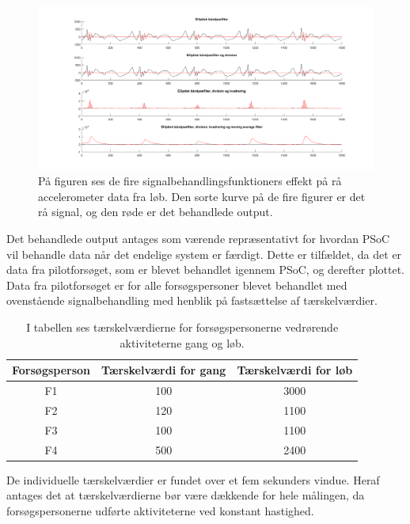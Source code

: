 \begin{figure}[H]
	\centering
	\includegraphics[scale=0.3]{figures/cDesign/signalbehandling_psoc.png}
	\caption{På figuren ses de fire signalbehandlingsfunktioners effekt på rå accelerometer data fra løb. Den sorte kurve på de fire figurer er det rå signal, og den røde er det behandlede output.}
	\label{fig:algoritme_cykling}
\end{figure}

Det behandlede output antages som værende repræsentativt for hvordan PSoC vil behandle data når det endelige system er færdigt. Dette er tilfældet, da det er data fra pilotforsøget, som er blevet behandlet igennem PSoC, og derefter plottet. Data fra pilotforsøget er for alle forsøgspersoner blevet behandlet med ovenstående signalbehandling med henblik på fastsættelse af tærskelværdier. 

\begin{table}[H]
	\centering
	\begin{tabular}{ccc}
		\hline
		\rowcolor[HTML]{C0C0C0} 
		Forsøgsperson & Tærskelværdi for gang & Tærskelværdi for løb \\ \hline
		\rowcolor[HTML]{FFFFFF} 
		F1 & 100 & 3000 \\ \hline
		\rowcolor[HTML]{FFFFFF} 
		F2 & 120 & 1100 \\ \hline
		\rowcolor[HTML]{FFFFFF} 
		F3 & 100 & 1100 \\ \hline
		\rowcolor[HTML]{FFFFFF} 
		F4 & 500 & 2400 \\ \hline
	\end{tabular}
	\caption{I tabellen ses tærskelværdierne for forsøgspersonerne vedrørende aktiviteterne gang og løb.}
	\label{tab:individuel_taerskel}
\end{table}
  
De individuelle tærskelværdier er fundet over et fem sekunders vindue. Heraf antages det at tærskelværdierne bør være dækkende for hele målingen, da forsøgspersonerne udførte aktiviteterne ved konstant hastighed.   

